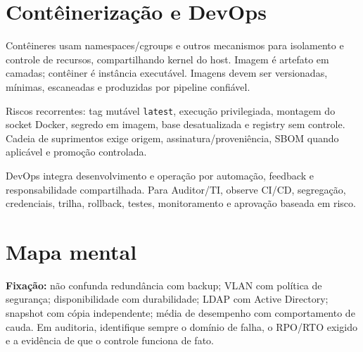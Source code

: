 \section{Contêinerização e DevOps}

Contêineres usam namespaces/cgroups e outros mecanismos para isolamento e controle de recursos, compartilhando kernel do host. Imagem é artefato em camadas; contêiner é instância executável. Imagens devem ser versionadas, mínimas, escaneadas e produzidas por pipeline confiável.

Riscos recorrentes: tag mutável \texttt{latest}, execução privilegiada, montagem do socket Docker, segredo em imagem, base desatualizada e registry sem controle. Cadeia de suprimentos exige origem, assinatura/proveniência, SBOM quando aplicável e promoção controlada.

DevOps integra desenvolvimento e operação por automação, feedback e responsabilidade compartilhada. Para Auditor/TI, observe CI/CD, segregação, credenciais, trilha, rollback, testes, monitoramento e aprovação baseada em risco.

\section{Mapa mental}


\begin{resumo}
\textbf{Fixação:} não confunda redundância com backup; VLAN com política de segurança; disponibilidade com durabilidade; LDAP com Active Directory; snapshot com cópia independente; média de desempenho com comportamento de cauda. Em auditoria, identifique sempre o domínio de falha, o RPO/RTO exigido e a evidência de que o controle funciona de fato.
\end{resumo}



